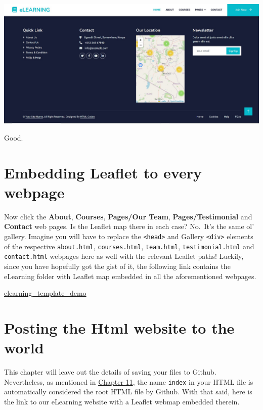 \documentclass[
]{book}
\begin{document}
\includegraphics{../images/location_elearning.jpg}

Good.

\hypertarget{embedding-leaflet-to-every-webpage}{%
\section{Embedding Leaflet to every webpage}\label{embedding-leaflet-to-every-webpage}}

Now click the \textbf{About}, \textbf{Courses}, \textbf{Pages/Our Team}, \textbf{Pages/Testimonial} and \textbf{Contact} web pages. Is the Leaflet map there in each case? No.~It's the same ol' gallery. Imagine you will have to replace the \texttt{\textless{}head\textgreater{}} and Gallery \texttt{\textless{}div\textgreater{}} elements of the respective \texttt{about.html}, \texttt{courses.html}, \texttt{team.html}, \texttt{testimonial.html} and \texttt{contact.html} webpages here as well with the relevant Leaflet paths! Luckily, since you have hopefully got the gist of it, the following link contains the eLearning folder with Leaflet map embedded in all the aforementioned webpages.

\href{https://github.com/sammigachuhi/my-leaflet-project/tree/main/elearning-template}{elearning\_template\_demo}

\hypertarget{posting-the-html-website-to-the-world}{%
\section{Posting the Html website to the world}\label{posting-the-html-website-to-the-world}}

This chapter will leave out the details of saving your files to Github. Nevertheless, as mentioned in \protect\hyperlink{mobile-friendly-webapps}{Chapter 11}, the name \texttt{index} in your HTML file is automatically considered the root HTML file by Github. With that said, here is the link to our eLearning website with a Leaflet webmap embedded therein.
\end{document}
